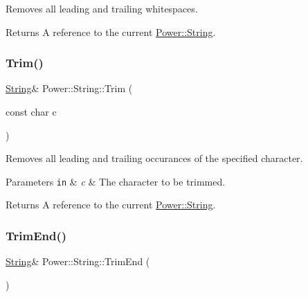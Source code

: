 Removes all leading and trailing whitespaces. 

\begin{DoxyReturn}{Returns}
A reference to the current \hyperlink{class_power_1_1_string}{Power\+::\+String}. 
\end{DoxyReturn}
\mbox{\label{class_power_1_1_string_a320511195a45fdb130083151a45bcf2d}} 
\subsubsection{\texorpdfstring{Trim()}{Trim()}\hspace{0.1cm}{\footnotesize\ttfamily [2/2]}}
{\footnotesize\ttfamily \hyperlink{class_power_1_1_string}{String}\& Power\+::\+String\+::\+Trim (\begin{DoxyParamCaption}\item[{const char}]{c }\end{DoxyParamCaption})\hspace{0.3cm}{\ttfamily [inline]}}



Removes all leading and trailing occurances of the specified character. 


\begin{DoxyParams}[1]{Parameters}
\mbox{\tt in}  & {\em c} & The character to be trimmed. \\
\hline
\end{DoxyParams}
\begin{DoxyReturn}{Returns}
A reference to the current \hyperlink{class_power_1_1_string}{Power\+::\+String}. 
\end{DoxyReturn}
\mbox{\label{class_power_1_1_string_ac5607bfb0efda47bafa4271a7ce6a3a9}} 
\subsubsection{\texorpdfstring{Trim\+End()}{TrimEnd()}\hspace{0.1cm}{\footnotesize\ttfamily [1/2]}}
{\footnotesize\ttfamily \hyperlink{class_power_1_1_string}{String}\& Power\+::\+String\+::\+Trim\+End (\begin{DoxyParamCaption}{ }\end{DoxyParamCaption})\hspace{0.3cm}{\ttfamily [inline]}}



